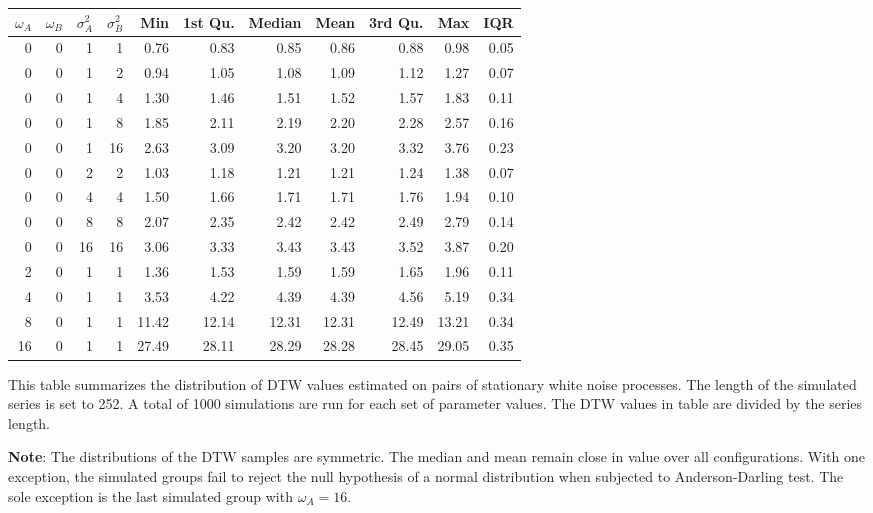 \begin{table}[!ht]
\begin{threeparttable}
\begin{tabular}{r r r r | r r r r r r r}
            \midrule
            $\omega_{A}$ & $\omega_{B}$ & $\sigma^{2}_{A}$ & $\sigma^{2}_{B}$ & Min & 1st Qu. & Median & Mean & 3rd Qu. & Max & IQR \\
            \midrule
            0  & 0 & 1  & 1  & 0.76 & 0.83 & 0.85 & 0.86 & 0.88 & 0.98 & 0.05 \\
            \midrule
            0  & 0 & 1  & 2  & 0.94 & 1.05 & 1.08 & 1.09 & 1.12 & 1.27 & 0.07 \\
            0  & 0 & 1  & 4  & 1.30 & 1.46 & 1.51 & 1.52 & 1.57 & 1.83 & 0.11 \\
            0  & 0 & 1  & 8  & 1.85 & 2.11 & 2.19 & 2.20 & 2.28 & 2.57 & 0.16 \\
            0  & 0 & 1  & 16 & 2.63 & 3.09 & 3.20 & 3.20 & 3.32 & 3.76 & 0.23 \\
            \midrule
            0  & 0 & 2  & 2  & 1.03 & 1.18 & 1.21 & 1.21 & 1.24 & 1.38 & 0.07 \\
            0  & 0 & 4  & 4  & 1.50 & 1.66 & 1.71 & 1.71 & 1.76 & 1.94 & 0.10 \\
            0  & 0 & 8  & 8  & 2.07 & 2.35 & 2.42 & 2.42 & 2.49 & 2.79 & 0.14 \\
            0  & 0 & 16 & 16 & 3.06 & 3.33 & 3.43 & 3.43 & 3.52 & 3.87 & 0.20 \\
            \midrule
            2  & 0 & 1  & 1  &  1.36 &  1.53 &  1.59 &  1.59 &  1.65 &  1.96 & 0.11 \\
            4  & 0 & 1  & 1  &  3.53 &  4.22 &  4.39 &  4.39 &  4.56 &  5.19 & 0.34 \\
            8  & 0 & 1  & 1  & 11.42 & 12.14 & 12.31 & 12.31 & 12.49 & 13.21 & 0.34 \\
            16 & 0 & 1  & 1  & 27.49 & 28.11 & 28.29 & 28.28 & 28.45 & 29.05 & 0.35 \\
            \hline
        \end{tabular}
        \begin{tablenotes}
            \item{This table summarizes the distribution of DTW values estimated on pairs of stationary white noise processes. The length of the simulated series is set to 252. A total of 1000 simulations are run for each set of parameter values. The DTW values in table are divided by the series length.}
            \item{\textbf{Note}: The distributions of the DTW samples are symmetric. The median and mean remain close in value over all configurations. With one exception, the simulated groups fail to reject the null hypothesis of a normal distribution when subjected to Anderson-Darling test. The sole exception is the last simulated group with $\omega_{A}=16$.}

\end{tablenotes}
\end{threeparttable}
\end{table}
